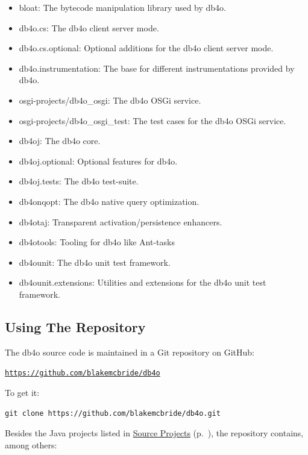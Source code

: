 \begin{itemize}
\item bloat: The bytecode manipulation library used by db4o.
\item db4o.cs: The db4o client server mode.
\item db4o.cs.optional: Optional additions for the db4o client server mode.
\item db4o.instrumentation: The base for different instrumentations provided by db4o.
\item osgi-projects/db4o\_osgi: The db4o OSGi service.
\item osgi-projects/db4o\_osgi\_test: The test cases for the db4o OSGi service.
\item db4oj: The db4o core.
\item db4oj.optional: Optional features for db4o.
\item db4oj.tests: The db4o test-suite.
\item db4onqopt: The db4o native query optimization.
\item db4otaj: Transparent activation/persistence enhancers.
\item db4otools: Tooling for db4o like Ant-tasks
\item db4ounit: The db4o unit test framework.
\item db4ounit.extensions: Utilities and extensions for the db4o unit test framework.
\end{itemize}

\subsection{Using The Repository}
\label{ref:community-working-with-source-using-the-repository}

The db4o source code is maintained in a Git repository on GitHub:

\href{https://github.com/blakemcbride/db4o}{\nolinkurl{https://github.com/blakemcbride/db4o}}

To get it:

\begin{lstlisting}
git clone https://github.com/blakemcbride/db4o.git
\end{lstlisting}

Besides the Java projects listed in \hyperref[ref:community-working-with-source-using-the-sources-from-db4o-distribution]{Source Projects} (p.~\pageref{ref:community-working-with-source-using-the-sources-from-db4o-distribution}), the repository contains, among others:

